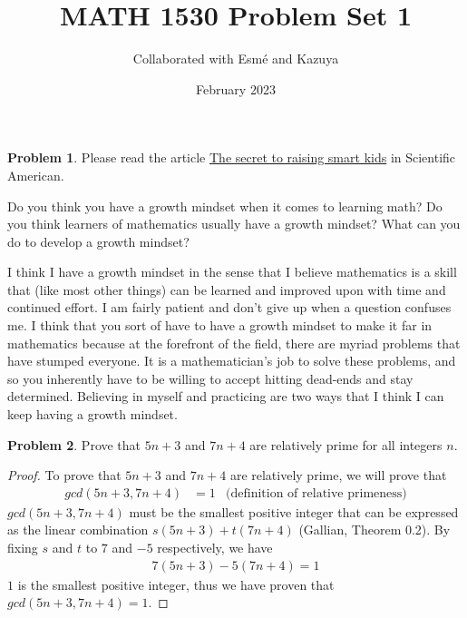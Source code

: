 \documentclass[12pt,reqno]{article}
\title{MATH 1530 Problem Set 1}
\author{Collaborated with Esmé and Kazuya}
\date{February 2023}
\theoremstyle{definition}
\newtheorem{problem}{Problem}
\begin{document}
\maketitle


\begin{problem} 
Please read the article \href{https://www.scientificamerican.com/article/the-secret-to-raising-smart-kids1/}{The secret to raising smart kids} in Scientific American.

Do you think you have a growth mindset when it comes to learning math? Do you think learners of mathematics usually have a growth mindset? What can you do to develop a growth mindset?
\end{problem}

I think I have a growth mindset in the sense that I believe mathematics is a skill that (like most other things) can be learned and improved upon with time and continued effort. I am fairly patient and don't give up when a question confuses me. I think that you sort of have to have a growth mindset to make it far in mathematics because at the forefront of the field, there are myriad problems that have stumped everyone. It is a mathematician's job to solve these problems, and so you inherently have to be willing to accept hitting dead-ends and stay determined. Believing in myself and practicing are two ways that I think I can keep having a growth mindset.

\newpage


\begin{problem}
    Prove that $5n+3$ and $7n+4$ are relatively prime for all integers $n$.
\end{problem}

\begin{proof}
    To prove that $5n+3$ and $7n+4$ are relatively prime, we will prove that 
    \begin{align*}
        gcd(5n + 3, 7n + 4) &= 1 & \text{(definition of relative primeness)}
    \end{align*}
    $gcd(5n + 3, 7n + 4)$ must be the smallest positive integer that can be expressed as the linear combination $s(5n+3) + t(7n+4)$ (Gallian, Theorem 0.2). By fixing $s$ and $t$ to $7$ and $-5$ respectively, we have
    \begin{align*}
        7(5n+3) - 5(7n+4) = 1
    \end{align*}
    $1$ is the smallest positive integer, thus we have proven that $gcd(5n + 3, 7n + 4) = 1$.
\end{proof}
\end{document}
